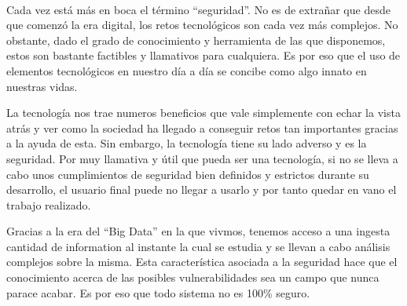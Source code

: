 
\chapter*{}

\thispagestyle{empty}

\cleardoublepage

\begin{center}
    {\large\bfseries \myTitle}\\
\end{center}

\begin{center}
    \myName\\
\end{center}

\\

\vspace{0.7cm}

\\

Cada vez está más en boca el término ``seguridad''. No es de extrañar que desde que comenzó la era digital, los retos tecnológicos son cada vez más complejos. No obstante, dado el grado 
de conocimiento y herramienta de las que disponemos, estos son bastante factibles y llamativos para cualquiera. Es por eso que el uso de elementos tecnológicos en nuestro día a día se
concibe como algo innato en nuestras vidas. 

La tecnología nos trae numeros beneficios que vale simplemente con echar la vista atrás y ver como la sociedad ha llegado a conseguir retos tan importantes gracias a la ayuda de esta. 
Sin embargo, la tecnología tiene su lado adverso y es la seguridad. Por muy llamativa y útil que pueda ser una tecnología, si no se lleva a cabo unos cumplimientos de seguridad bien definidos
y estrictos durante su desarrollo, el usuario final puede no llegar a usarlo y por tanto quedar en vano el trabajo realizado.

Gracias a la era del ``Big Data'' en la que vivmos, tenemos acceso a una ingesta cantidad de information al instante la cual se estudia y se llevan a cabo análisis complejos sobre la misma. 
Esta característica asociada a la seguridad hace que el conocimiento acerca de las posibles vulnerabilidades sea un campo que nunca parace acabar. Es por eso que todo sistema no es 100\%
seguro.

